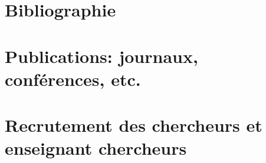 \documentclass[a4paper,10pt]{book_ad}
\begin{document}
\chapter{Bibliographie}
\minitoc



\chapter{Publications: journaux, conférences, etc.}
\minitoc



\chapter{Recrutement des chercheurs et enseignant chercheurs}
\minitoc



\appendix



\printnomenclature
\clearpage

%

\end{document}
